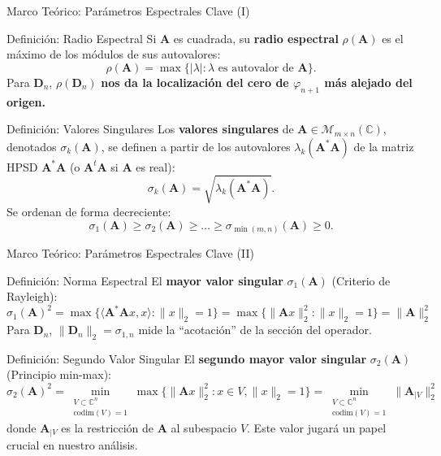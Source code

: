 \begin{frame}{Marco Teórico: Parámetros Espectrales Clave (I)}\footnotesize
	\begin{block}{Definición: Radio Espectral \cite{dunford1963linear}}
		Si $\mathbf{A}$ es cuadrada, su \textbf{radio espectral} $\rho(\mathbf{A})$ es el máximo de los módulos de sus autovalores:
		$$ \rho(\mathbf{A}) = \max \{ |\lambda| : \lambda \text{ es autovalor de } \mathbf{A} \}. $$
		Para $\mathbf{D}_n$, $\rho(\mathbf{D}_n)$ \textbf{nos da la localización del cero de $\varphi_{n+1}$ más alejado del origen.}
	\end{block}
	\pause
	\begin{block}{Definición: Valores Singulares \cite{Horn_Johnson_2012}}
		Los \textbf{valores singulares} de $\mathbf{A} \in \mathcal{M}_{m \times n}(\mathbb{C})$, denotados $\sigma_k(\mathbf{A})$, se definen a partir de los autovalores $\lambda_k(\mathbf{A}^*\mathbf{A})$ de la matriz HPSD $\mathbf{A}^*\mathbf{A}$ (o $\mathbf{A}^t\mathbf{A}$ si $\mathbf{A}$ es real):
		$$ \sigma_k(\mathbf{A}) = \sqrt{\lambda_k(\mathbf{A}^*\mathbf{A})}. $$
		Se ordenan de forma decreciente:
		$$ \sigma_1(\mathbf{A}) \ge \sigma_2(\mathbf{A}) \ge \dots \ge \sigma_{\min(m,n)}(\mathbf{A}) \ge 0. $$
	\end{block}
\end{frame}

\begin{frame}{Marco Teórico: Parámetros Espectrales Clave (II)}
	\begin{block}{Definición: Norma Espectral}
		El \textbf{mayor valor singular} $\sigma_1(\mathbf{A})$ (Criterio de Rayleigh):
		$$
			\sigma_{1}(\mathbf{A})^2 =
			\max \{ \langle\mathbf{A}^{*}\mathbf{A}x,x\rangle: \| x \|_2 =1 \}
			= \max \{\| \mathbf{A} x \|_2^2 : \| x \|_2 =1\}=
			\| \mathbf{A} \|_2^2
		$$
		Para $\mathbf{D}_n$, $\|\mathbf{D}_n\|_2 = \sigma_{1,n}$ mide la ``acotación'' de la sección del operador.
	\end{block}
	\begin{block}{Definición: Segundo Valor Singular}
		El \textbf{segundo mayor valor singular} $\sigma_2(\mathbf{A})$ (Principio min-max):
		$$
			\sigma_{2}(\mathbf{A})^2 = \min_{\substack{V \subset \mathbb{C}^n \\ \text{codim}(V)=1}} \max \{\| \mathbf{A}x \|_2^2 : x\in V, \| x \|_2 =1\}= \min_{\substack{V \subset \mathbb{C}^n \\ \text{codim}(V)=1}} \| \mathbf{A}_{|V} \|_2^2
		$$
		donde $\mathbf{A}_{|V}$ es la restricción de $\mathbf{A}$ al subespacio $V$. Este valor jugará un papel crucial en nuestro análisis.
	\end{block}
\end{frame}

